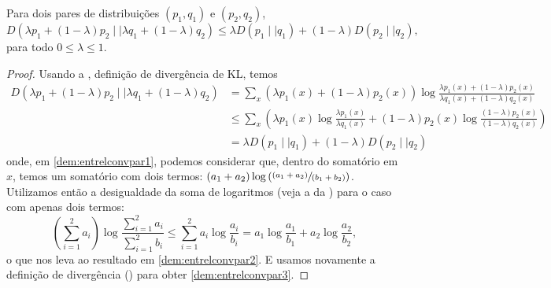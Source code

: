 \begin{theorem}
Para dois pares de distribuições $(p_1, q_1)$ e $(p_2, q_2)$, 
\begin{equation}\label{eq:entrelconvpar}
D(\lambda p_1 + (1 - \lambda) p_2 \mid\mid \lambda q_1 + (1- \lambda)q_2) \leq \lambda D(p_1 \mid\mid q_1) + (1- \lambda) D(p_2 \mid\mid q_2) ,
\end{equation}
para todo $0 \leq \lambda \leq 1$.
\end{theorem}
\begin{proof}
Usando a , definição de divergência de KL, temos
\begin{subequations}\label{dem:entrelconvpar}
\begin{align}
    D(\lambda p_1 + (1 - \lambda) p_2 \mid\mid \lambda q_1 + (1- \lambda)q_2) &= \sum_x (\lambda p_1(x) + (1 - \lambda) p_2(x) ) \log \frac{\lambda p_1(x) + (1 - \lambda) p_2(x)}{\lambda q_1(x) + (1 - \lambda) q_2(x)} \label{dem:entrelconvpar1} \\
									&\leq \sum_x \left( \lambda p_1(x) \log \frac{\lambda p_1(x)}{\lambda q_1(x)} + (1 - \lambda) p_2(x) \log \frac{(1 - \lambda) p_2(x)}{(1-\lambda) q_2(x)} \right) \label{dem:entrelconvpar2} \\
									&= \lambda D(p_1 \mid\mid q_1) + (1 - \lambda) D(p_2 \mid\mid q_2) \label{dem:entrelconvpar3}
\end{align}
\end{subequations}
onde, em \ref{dem:entrelconvpar1}, podemos considerar que, dentro do somatório em $x$, temos um somatório com dois termos: $(a_1+a_2) \log \left( \sfrac{(a_1+a_2)}{(b_1 + b_2)} \right)$.
Utilizamos então a desigualdade da soma de logaritmos (veja a  da ) para o caso com apenas dois termos:
\begin{equation}
\left( \sum_{i=1}^2 a_i \right) \log \frac{\sum_{i=1}^2 a_i}{\sum_{i=1}^{2} b_i} \leq \sum_{i=1}^2 a_i \log \frac{a_i}{b_i} =  a_1 \log \frac{a_1}{b_1} + a_2 \log \frac{a_2}{b_2},
\end{equation}
  o que nos leva ao resultado em \ref{dem:entrelconvpar2}. E usamos novamente a definição de divergência () para obter \ref{dem:entrelconvpar3}.
\end{proof}




